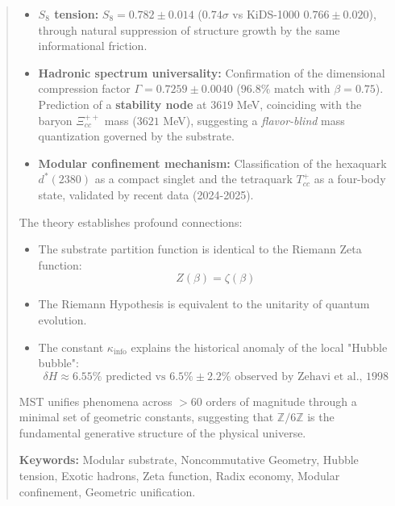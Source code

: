 \documentclass[11pt, a4paper]{article}
\theoremstyle{plain}
\theoremstyle{definition}
\newcommand{\Kinfo}{\kappa_{\text{info}}}
\begin{document}
\begin{abstract}
\begin{itemize}
    \item \textbf{$S_8$ tension:} $S_8 = 0.782 \pm 0.014$ ($0.74\sigma$ vs KiDS-1000 $0.766 \pm 0.020$), through natural suppression of structure growth by the same informational friction.
    
    \item \textbf{Hadronic spectrum universality:} Confirmation of the dimensional compression factor $\Gamma = 0.7259 \pm 0.0040$ ($96.8\%$ match with $\beta = 0.75$). Prediction of a \textbf{stability node} at $3619$ MeV, coinciding with the baryon $\Xi_{cc}^{++}$ mass ($3621$ MeV), suggesting a \textit{flavor-blind} mass quantization governed by the substrate.
    
    \item \textbf{Modular confinement mechanism:} Classification of the hexaquark $d^*(2380)$ as a compact singlet and the tetraquark $T_{cc}^+$ as a four-body state, validated by recent data (2024-2025).
\end{itemize}

The theory establishes profound connections:

\begin{itemize}
    \item The substrate partition function is identical to the Riemann Zeta function:
\[ Z(\beta) = \zeta(\beta) \]
    \item The Riemann Hypothesis is equivalent to the unitarity of quantum evolution.
    \item The constant $\Kinfo$ explains the historical anomaly of the local "Hubble bubble":
\[ \delta H \approx 6.55\% \text{ predicted vs } 6.5\% \pm 2.2\% \text{ observed by Zehavi et al., 1998} \]
\end{itemize}

MST unifies phenomena across $>60$ orders of magnitude through a minimal set of geometric constants, suggesting that $\mathbb{Z}/6\mathbb{Z}$ is the fundamental generative structure of the physical universe.

\vspace{0.5cm}
\noindent\textbf{Keywords:} Modular substrate, Noncommutative Geometry, Hubble tension, Exotic hadrons, Zeta function, Radix economy, Modular confinement, Geometric unification.
\end{abstract}

\end{document}

